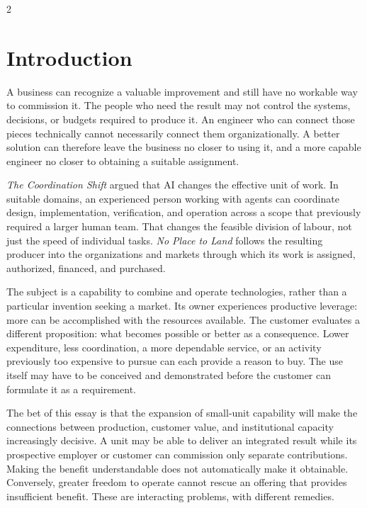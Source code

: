 \clearpage
\begin{multicols}{2}

\section{Introduction}\label{introduction}

A business can recognize a valuable improvement and still have no
workable way to commission it. The people who need the result may not
control the systems, decisions, or budgets required to produce it. An
engineer who can connect those pieces technically cannot necessarily
connect them organizationally. A better solution can therefore leave the
business no closer to using it, and a more capable engineer no closer to
obtaining a suitable assignment.

\emph{The Coordination Shift} \citep{blomgren2025coordination} argued
that AI changes the effective unit of work. In suitable domains, an
experienced person working with agents can coordinate design,
implementation, verification, and operation across a scope that
previously required a larger human team. That changes the feasible
division of labour, not just the speed of individual tasks. \emph{No
Place to Land} follows the resulting producer into the organizations and
markets through which its work is assigned, authorized, financed, and
purchased.

The subject is a capability to combine and operate technologies, rather
than a particular invention seeking a market. Its owner experiences
productive leverage: more can be accomplished with the resources
available. The customer evaluates a different proposition: what becomes
possible or better as a consequence. Lower expenditure, less
coordination, a more dependable service, or an activity previously too
expensive to pursue can each provide a reason to buy. The use itself may
have to be conceived and demonstrated before the customer can formulate
it as a requirement.

The bet of this essay is that the expansion of small-unit capability
will make the connections between production, customer value, and
institutional capacity increasingly decisive. A unit may be able to
deliver an integrated result while its prospective employer or customer
can commission only separate contributions. Making the benefit
understandable does not automatically make it obtainable. Conversely,
greater freedom to operate cannot rescue an offering that provides
insufficient benefit. These are interacting problems, with different
remedies.


\end{multicols}
